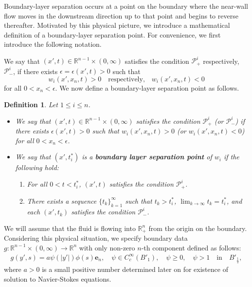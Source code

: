 \documentclass{amsart}
\newtheorem{definition}[defn]{Definition}
\numberwithin{equation}{section}
\newcommand{\R}{{ \mathbb R}^n}
\begin{document}

Boundary-layer separation occurs at a point on the boundary where the near-wall
flow moves in the downstream direction up to that point and begins to reverse
thereafter.  Motivated by this physical picture, we introduce a mathematical
definition of a boundary-layer separation point.
For convenience, we first introduce the following notation.  

We say that
$(x',t)\in \mathbb{R}^{n-1}\times (0,\infty)$
satisfies the condition \({\mathcal P}^i_{+}\) respectively, \({\mathcal P}^i_{-}\),
if there exists \(\epsilon=\epsilon(x',t)>0\) such that
\[
w_i(x',x_n,t)>0
\quad
\text{respectively,}\quad
w_i(x',x_n,t)<0
\]
for all \(0<x_n<\epsilon\).
We now define a boundary-layer separation point as follows.

\begin{definition}\label{def-blsp}
Let $1 \leq i \leq n$. 

\begin{itemize}
\item[(1)]
We say that $(x', t) \in \mathbb{R}^{n-1} \times (0, \infty)$ satisfies the condition ${\mathcal P}^i_{+}$ (or ${\mathcal P}^i_{-}$) if there exists $\epsilon(x', t) > 0$ such that $w_i(x', x_n, t) > 0$ (or $w_i(x', x_n, t) < 0$) for all $0 < x_n < \epsilon$.

\item[(2)]
We say that $(x', t^*_i)$ is a \textbf{boundary layer separation point} of $w_i$ if the following hold:
\begin{enumerate}
    \item[(i)] For all $0 < t < t^*_i$, $(x', t)$ satisfies the condition ${\mathcal P}^i_+$.
    \item[(ii)] There exists a sequence $\{t_k\}_{k=1}^\infty$ such that $t_k > t^*_i$, $\lim_{k \to \infty} t_k = t^*_i$, and each $(x', t_k)$ satisfies the condition ${\mathcal P}^i_-$.
\end{enumerate}
\end{itemize}
\end{definition}



 

We will assume that the fluid is flowing into  $\R_+$ from the origin on the boundary. Considering this physical situation, we specify  boundary data $g:\mathbb R^{n-1}\times  (0, \infty) \rightarrow  \R$ with only non-zero $n$-th component defined
as follows:
\begin{align}\label{0502-6}
g(y', s)  = a \psi (|y'|)\phi(s)\textbf{e}_n, \quad \psi \in C^\infty_c (B'_1), \quad  \psi \geq 0, \quad \psi  >  1 \quad \mbox{in} \quad B'_\frac12, 
\end{align}
where $a> 0$ is a small positive number determined later on for existence of solution to  Navier-Stokes equations.
\end{document}
